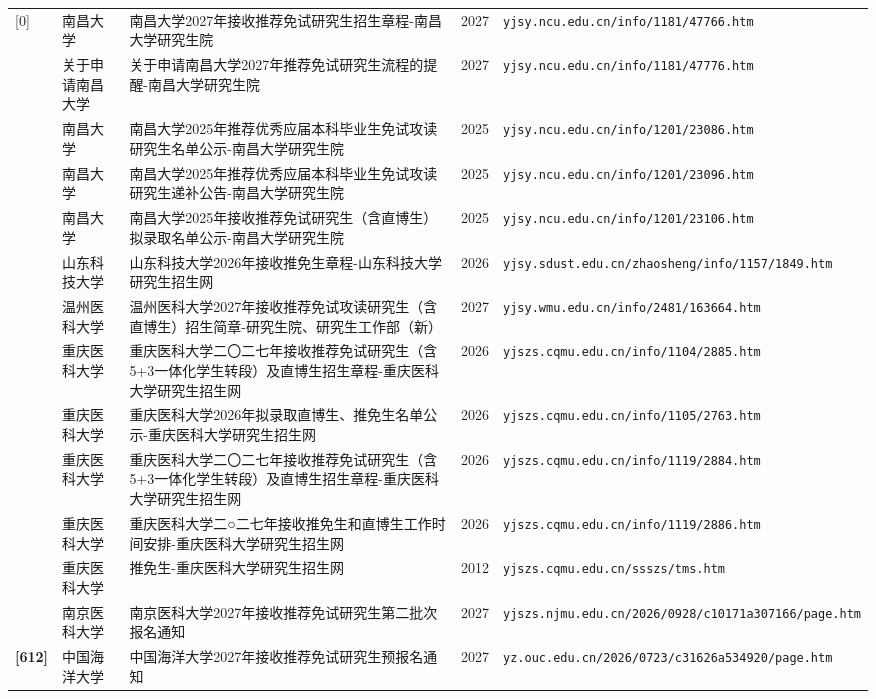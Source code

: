 {\begin{longtable}{@{}p{1.15cm}p{2.9cm}p{6.3cm}p{0.85cm}p{5.0cm}@{}}
[0] & 南昌大学 & 南昌大学2027年接收推荐免试研究生招生章程-南昌大学研究生院 & 2027 & \texttt{yjsy.ncu.edu.cn/info/1181/47766.htm} \\
[0] & 关于申请南昌大学 & 关于申请南昌大学2027年推荐免试研究生流程的提醒-南昌大学研究生院 & 2027 & \texttt{yjsy.ncu.edu.cn/info/1181/47776.htm} \\
[0] & 南昌大学 & 南昌大学2025年推荐优秀应届本科毕业生免试攻读研究生名单公示-南昌大学研究生院 & 2025 & \texttt{yjsy.ncu.edu.cn/info/1201/23086.htm} \\
[0] & 南昌大学 & 南昌大学2025年推荐优秀应届本科毕业生免试攻读研究生递补公告-南昌大学研究生院 & 2025 & \texttt{yjsy.ncu.edu.cn/info/1201/23096.htm} \\
[0] & 南昌大学 & 南昌大学2025年接收推荐免试研究生（含直博生）拟录取名单公示-南昌大学研究生院 & 2025 & \texttt{yjsy.ncu.edu.cn/info/1201/23106.htm} \\
[0] & 山东科技大学 & 山东科技大学2026年接收推免生章程-山东科技大学研究生招生网 & 2026 & \texttt{yjsy.sdust.edu.cn/zhaosheng/info/1157/1849.htm} \\
[0] & 温州医科大学 & 温州医科大学2027年接收推荐免试攻读研究生（含直博生）招生简章-研究生院、研究生工作部（新） & 2027 & \texttt{yjsy.wmu.edu.cn/info/2481/163664.htm} \\
[0] & 重庆医科大学 & 重庆医科大学二〇二七年接收推荐免试研究生（含5+3一体化学生转段）及直博生招生章程-重庆医科大学研究生招生网 & 2026 & \texttt{yjszs.cqmu.edu.cn/info/1104/2885.htm} \\
[0] & 重庆医科大学 & 重庆医科大学2026年拟录取直博生、推免生名单公示-重庆医科大学研究生招生网 & 2026 & \texttt{yjszs.cqmu.edu.cn/info/1105/2763.htm} \\
[0] & 重庆医科大学 & 重庆医科大学二〇二七年接收推荐免试研究生（含5+3一体化学生转段）及直博生招生章程-重庆医科大学研究生招生网 & 2026 & \texttt{yjszs.cqmu.edu.cn/info/1119/2884.htm} \\
[0] & 重庆医科大学 & 重庆医科大学二○二七年接收推免生和直博生工作时间安排-重庆医科大学研究生招生网 & 2026 & \texttt{yjszs.cqmu.edu.cn/info/1119/2886.htm} \\
[0] & 重庆医科大学 & 推免生-重庆医科大学研究生招生网 & 2012 & \texttt{yjszs.cqmu.edu.cn/ssszs/tms.htm} \\
[0] & 南京医科大学 & 南京医科大学2027年接收推荐免试研究生第二批次报名通知 & 2027 & \texttt{yjszs.njmu.edu.cn/2026/0928/c10171a307166/page.htm} \\
\textbf{[612]} & 中国海洋大学 & 中国海洋大学2027年接收推荐免试研究生预报名通知 & 2027 & \texttt{yz.ouc.edu.cn/2026/0723/c31626a534920/page.htm} \\

\end{longtable}}
